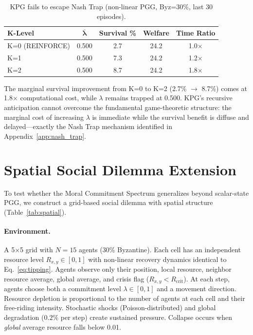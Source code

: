 \documentclass{article}
\begin{document}
\begin{table}[h]
\centering
\caption{KPG fails to escape Nash Trap (non-linear PGG, Byz=30\%, last 30 episodes).}
\label{tab:kpg}
\begin{tabular}{lcccc}
\toprule
\textbf{K-Level} & $\boldsymbol{\bar{\lambda}}$ & \textbf{Survival \%} & \textbf{Welfare} & \textbf{Time Ratio} \\
\midrule
K=0 (REINFORCE) & 0.500 & 2.7 & 24.2 & 1.0$\times$ \\
K=1 & 0.500 & 7.3 & 24.2 & 1.2$\times$ \\
K=2 & 0.500 & 8.7 & 24.2 & 1.8$\times$ \\
\bottomrule
\end{tabular}
\end{table}

\noindent The marginal survival improvement from K=0 to K=2 (2.7\% $\to$ 8.7\%) comes at 1.8$\times$ computational cost, while $\lambda$ remains trapped at 0.500.
KPG's recursive anticipation cannot overcome the fundamental game-theoretic structure: the marginal cost of increasing $\lambda$ is immediate while the survival benefit is diffuse and delayed---exactly the Nash Trap mechanism identified in Appendix~\ref{app:nash_trap}.

\section{Spatial Social Dilemma Extension}
\label{app:spatial}

To test whether the Moral Commitment Spectrum generalizes beyond scalar-state PGG, we construct a grid-based social dilemma with spatial structure (Table~\ref{tab:spatial}).

\paragraph{Environment.}
A 5$\times$5 grid with $N{=}15$ agents (30\% Byzantine).
Each cell has an independent resource level $R_{x,y} \in [0,1]$ with non-linear recovery dynamics identical to Eq.~\ref{eq:tipping}.
Agents observe only their position, local resource, neighbor resource average, global average, and crisis flag ($R_{x,y} < R_{\text{crit}}$).
At each step, agents choose both a commitment level $\lambda \in [0,1]$ and a movement direction.
Resource depletion is proportional to the number of agents at each cell and their free-riding intensity.
Stochastic shocks (Poisson-distributed) and global degradation ($0.2\%$ per step) create sustained pressure.
Collapse occurs when \emph{global} average resource falls below 0.01.
\end{document}
